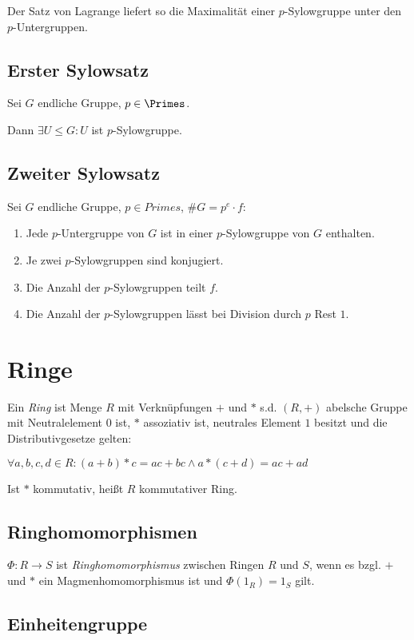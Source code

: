 Der Satz von Lagrange liefert so die Maximalität einer $p$-Sylowgruppe unter den $p$-Untergruppen.

\subsection*{Erster Sylowsatz}

Sei $G$ endliche Gruppe, $p \in \Primes$.

Dann $\exists U \leq G : U$ ist $p$-Sylowgruppe.

\subsection*{Zweiter Sylowsatz}

Sei $G$ endliche Gruppe, $p \in Primes$, $\#G = p^e \cdot f$:

\begin{enumerate}[label=(\alph*)]
	\item Jede $p$-Untergruppe von $G$ ist in einer $p$-Sylowgruppe von $G$ enthalten.
	\item Je zwei $p$-Sylowgruppen sind konjugiert.
	\item Die Anzahl der $p$-Sylowgruppen teilt $f$.
	\item Die Anzahl der $p$-Sylowgruppen lässt bei Division durch $p$ Rest $1$.
\end{enumerate}

\section*{Ringe}

Ein \emph{Ring} ist Menge $R$ mit Verknüpfungen $+$ und $*$ s.d. $(R,+)$ abelsche Gruppe mit Neutralelement $0$ ist, $*$ assoziativ ist, neutrales Element $1$ besitzt und die Distributivgesetze gelten:

$\forall a, b, c, d \in R : (a+b)*c = ac+bc \land a*(c+d) = ac + ad$

Ist $*$ kommutativ, heißt $R$ kommutativer Ring.

\subsection*{Ringhomomorphismen}

$\Phi : R \to S$ ist \emph{Ringhomomorphismus} zwischen Ringen $R$ und $S$, wenn es bzgl. $+$ und $*$ ein Magmenhomomorphismus ist und $\Phi(1_R) = 1_S$ gilt.

\subsection*{Einheitengruppe}

